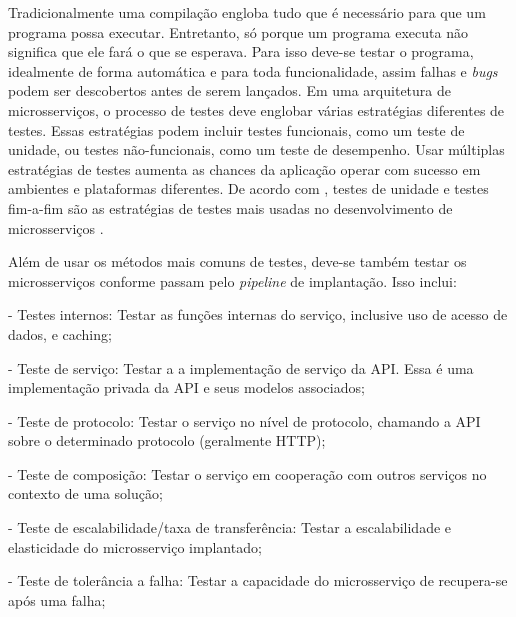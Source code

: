Tradicionalmente uma compilação engloba tudo que é necessário para que um programa possa executar. Entretanto, só porque um programa executa não significa que ele fará o que se esperava. Para isso deve-se testar o programa, idealmente de forma automática e para toda funcionalidade, assim falhas e \emph{bugs} podem ser descobertos antes de serem lançados. Em uma arquitetura de microsserviços, o processo de testes deve englobar várias estratégias diferentes de testes. Essas estratégias podem incluir testes funcionais, como um teste de unidade, ou testes não-funcionais, como um teste de desempenho. Usar múltiplas estratégias de testes aumenta as chances da aplicação operar com sucesso em ambientes e plataformas diferentes. De acordo com , testes de unidade e testes fim-a-fim são as estratégias de testes mais usadas no desenvolvimento de microsserviços \cite{martin-fowler-continuous-integration,Familiar2015}.


Além de usar os métodos mais comuns de testes, deve-se também testar os microsserviços conforme passam pelo \emph{pipeline} de implantação. Isso inclui: \cite{Familiar2015}

- Testes internos: Testar as funções internas do serviço, inclusive uso de acesso de dados, e caching;

- Teste de serviço: Testar a a implementação de serviço da API. Essa é uma implementação privada da API e seus modelos associados;

- Teste de protocolo: Testar o serviço no nível de protocolo, chamando a API sobre o determinado protocolo (geralmente HTTP);

- Teste de composição: Testar o serviço em cooperação com outros serviços no contexto de uma solução;

- Teste de escalabilidade/taxa de transferência: Testar a escalabilidade e elasticidade do microsserviço implantado;

- Teste de tolerância a falha: Testar a capacidade do microsserviço de recupera-se após uma falha;

